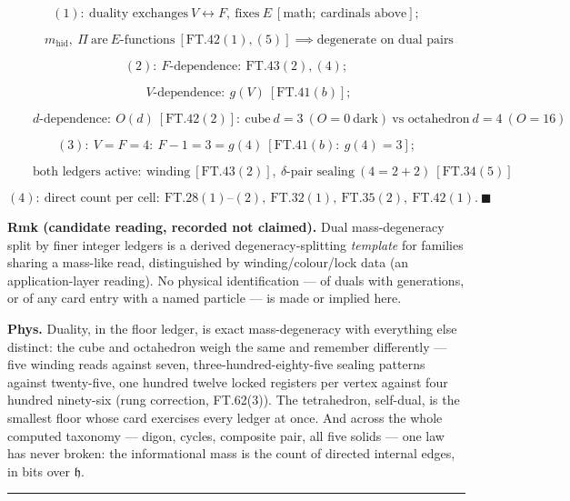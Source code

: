 \begin{theorem}
\[
(1):\ \text{duality exchanges}\ V\leftrightarrow F,\ \text{fixes}\ E\ [\text{math};\ \text{cardinals above}];
\]

\[
\qquad m_{\mathrm{hid}},\ \Pi\ \text{are}\ E\text{-functions}\ [\mathrm{FT.42}(1),(5)]\implies\text{degenerate on dual pairs}
\]

\[
(2):\ F\text{-dependence}:\ \mathrm{FT.43}(2),(4);
\]

\[
\qquad V\text{-dependence}:\ g(V)\ [\mathrm{FT.41}(b)];
\]

\[
\qquad d\text{-dependence}:\ O(d)\ [\mathrm{FT.42}(2)]:\ \text{cube}\ d{=}3\ (O{=}0\ \text{dark})\ \text{vs octahedron}\ d{=}4\ (O{=}16)
\]

\[
(3):\ V=F=4:\ F-1=3=g(4)\ [\mathrm{FT.41}(b):\ g(4)=3];
\]

\[
\qquad \text{both ledgers active}:\ \text{winding}\ [\mathrm{FT.43}(2)],\ \delta\text{-pair sealing}\ (4=2{+}2)\ [\mathrm{FT.34}(5)]
\]

\[
(4):\ \text{direct count per cell}:\ \mathrm{FT.28}(1)\text{--}(2),\ \mathrm{FT.32}(1),\ \mathrm{FT.35}(2),\ \mathrm{FT.42}(1).\ \blacksquare
\]

\textbf{Rmk (candidate reading, recorded not claimed).} Dual mass-degeneracy split by finer integer ledgers is a derived degeneracy-splitting \textit{template} for families sharing a mass-like read, distinguished by winding/colour/lock data (an application-layer reading). No physical identification — of duals with generations, or of any card entry with a named particle — is made or implied here.

\textbf{Phys.} Duality, in the floor ledger, is exact mass-degeneracy with everything else distinct: the cube and octahedron weigh the same and remember differently — five winding reads against seven, three-hundred-eighty-five sealing patterns against twenty-five, one hundred twelve locked registers per vertex against four hundred ninety-six (rung correction, FT.62(3)). The tetrahedron, self-dual, is the smallest floor whose card exercises every ledger at once. And across the whole computed taxonomy — digon, cycles, composite pair, all five solids — one law has never broken: the informational mass is the count of directed internal edges, in bits over $\mathfrak h$.

\vspace{2pt}\noindent\rule{\textwidth}{0.4pt}\vspace{2pt}

\end{theorem}

